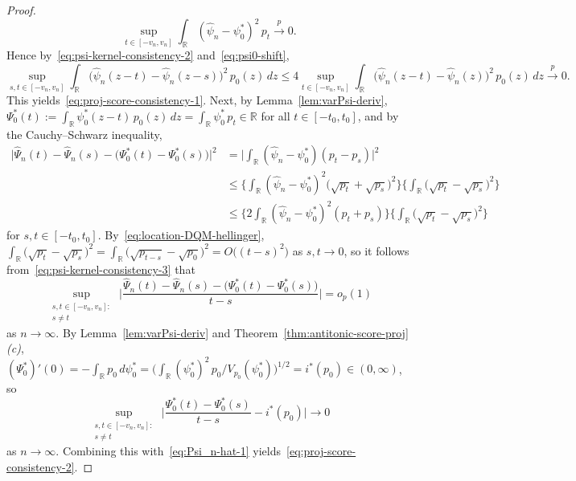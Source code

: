 \documentclass[a4paper]{article}
\newcommand{\R}{\mathbb{R}}
\newcommand{\cvp}{\overset{p}{\to}}
\theoremstyle{definition}
\begin{document}
\begin{proof}
\begin{equation}
\sup_{t \in [-v_n,v_n]}\int_\R (\hat{\psi}_n - \psi_0^*)^2\,p_t \cvp 0.
\end{equation}
Hence by~\eqref{eq:psi-kernel-consistency-2} and~\eqref{eq:psi0-shift},
\[
\sup_{s,t \in [-v_n,v_n]}\int_\R \bigl(\hat{\psi}_n(z - t) - \hat{\psi}_n(z - s)\bigr)^2\,p_0(z)\,dz \leq 4\sup_{t \in [-v_n,v_n]} \int_\R \bigl(\hat{\psi}_n(z - t) - \hat{\psi}_n(z)\bigr)^2\,p_0(z)\,dz \cvp 0.
\]
This yields~\eqref{eq:proj-score-consistency-1}. Next, by Lemma~\ref{lem:varPsi-deriv}, $\Psi_0^*(t) := \int_\R \psi_0^*(z - t)\,p_0(z)\,dz = \int_\R \psi_0^*\,p_t \in \R$ for all $t \in [-t_0,t_0]$, and by the Cauchy--Schwarz inequality,
\begin{align*}
\bigl|\hat{\Psi}_n(t) - \hat{\Psi}_n(s) - \bigl(\Psi_0^*(t) - \Psi_0^*(s)\bigr)\bigr|^2 &=
\biggl|\int_\R (\hat{\psi}_n - \psi_0^*)(p_t - p_s)\biggr|^2 \\
&\leq \biggl\{\int_\R (\hat{\psi}_n - \psi_0^*)^2 \bigl(\sqrt{p_t} + \sqrt{p_s}\bigr)^2\biggr\}\biggl\{\int_\R \bigl(\sqrt{p_t} - \sqrt{p_s}\bigr)^2\biggr\} \\
&\leq \biggl\{2\int_\R (\hat{\psi}_n - \psi_0^*)^2 (p_t + p_s)\biggr\}\biggl\{\int_\R \bigl(\sqrt{p_t} - \sqrt{p_s}\bigr)^2\biggr\}
\end{align*}
for $s,t \in [-t_0,t_0]$. By~\eqref{eq:location-DQM-hellinger},
$\int_\R \bigl(\sqrt{p_t} - \sqrt{p_s}\bigr)^2 = \int_\R \bigl(\sqrt{p_{t - s}} - \sqrt{p_0}\bigr)^2 = O\bigl((t - s)^2\bigr)$ as $s,t \to 0$, so it follows from~\eqref{eq:psi-kernel-consistency-3} that
\begin{equation}
\label{eq:Psi_n-hat-1}
\sup_{\substack{s,t \in [-v_n,v_n] : \\ s \neq t}}\, \biggl|\frac{\hat{\Psi}_n(t) - \hat{\Psi}_n(s) - \bigl(\Psi_0^*(t) - \Psi_0^*(s)\bigr)}{t - s}\biggr| = o_p(1)
\end{equation}
as $n \to \infty$. By Lemma~\ref{lem:varPsi-deriv} and Theorem~\ref{thm:antitonic-score-proj}\emph{(c)}, $(\Psi_0^*)'(0) = -\int_\R p_0\,d\psi_0^* = \bigl(\int_\R (\psi_0^*)^2\,p_0\big/V_{p_0}(\psi_0^*)\bigr)^{1/2} = i^*(p_0) \in (0,\infty)$, so
\[
\sup_{\substack{s,t \in [-v_n,v_n] : \\ s \neq t}}\, \biggl|\frac{\Psi_0^*(t) - \Psi_0^*(s)}{t - s} - i^*(p_0)\biggr| \to 0
\]
as $n \to \infty$. Combining this with~\eqref{eq:Psi_n-hat-1} yields~\eqref{eq:proj-score-consistency-2}.
\end{proof}
\end{document}
